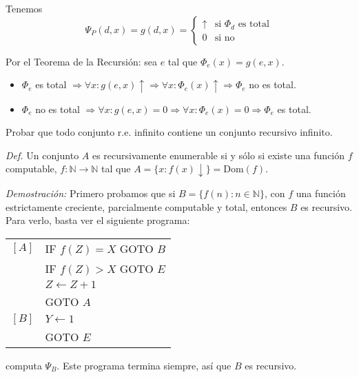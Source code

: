 \begin{questions}
\begin{solution}
 Tenemos
 \begin{equation*}
    \Psi_P(d,x) = g(d,x) = \left\{ \begin{matrix} 
      \uparrow & \text{si } \Phi_d \text{ es total} \\ 
      0 & \text{si no}
    \end{matrix} \right.
  \end{equation*}
  
 Por el Teorema de la Recursi\'on: sea $e$ tal que $\Phi_e(x)=g(e,x)$. 
 
 \begin{itemize}
  \item $\Phi_e$ es total $\Rightarrow\forall x: g(e,x)\uparrow\Rightarrow\forall x:\Phi_e(x)\uparrow\Rightarrow \Phi_e$ no es total.
  \item $\Phi_e$ no es total $\Rightarrow\forall x: g(e,x)=0 \Rightarrow\forall x: \Phi_e(x)=0\Rightarrow \Phi_e$ es total. 
 \end{itemize}

\end{solution}

\question Probar que todo conjunto r.e. infinito contiene un conjunto recursivo infinito. 

\begin{solution}
 
 {\it Def. } Un conjunto $A$ es recursivamente enumerable si y s\'olo si existe una funci\'on $f$ computable, $f: \mathbb{N} \rightarrow \mathbb{N}$ tal que $A = \{x : f(x)\downarrow \} = \text{Dom}(f)$.
 
 {\it Demostraci\'on: } Primero probamos que si $B = \{ f(n) : n \in \mathbb{N} \}$, con $f$ una funci\'on estrictamente creciente, parcialmente computable y total, entonces $B$ es recursivo. Para verlo, basta ver el siguiente programa: 

 \vspace{0.5cm}
  \begin{tabular}{rl}
    $[A]$ & IF $f(Z)=X$ GOTO $B$ \\
	  & IF $f(Z)>X$ GOTO $E$ \\ 
	  & $Z\leftarrow Z+1$\\
	  & GOTO $A$\\
    $[B]$ & $Y\leftarrow 1$ \\
	  & GOTO $E$
  \end{tabular}
 \vspace{0.5cm}
 
 computa $\Psi_B$. Este programa termina siempre, as\'i que $B$ es recursivo. 
 

\end{solution}
\end{questions}
